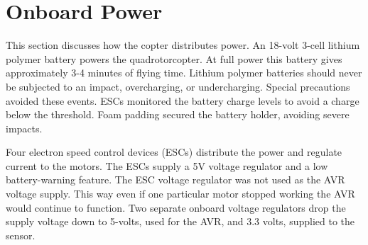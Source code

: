 \section{Onboard Power} 

This section discusses how the copter distributes power.  An 18-volt 3-cell lithium polymer battery powers the quadrotorcopter. At full power this battery gives approximately 3-4 minutes of flying time. Lithium polymer batteries should never be subjected to an impact, overcharging, or undercharging.  Special precautions avoided these events.  ESCs monitored the battery charge levels to avoid a charge below the threshold. Foam padding secured the battery holder, avoiding severe impacts.    %

Four electron speed control devices (ESCs) distribute the power and regulate current to the motors. The ESCs supply a 5V voltage regulator and a low battery-warning feature. The ESC voltage regulator was not used as the AVR voltage supply.   This way even if one particular motor stopped working the AVR would continue to function.  Two separate onboard voltage regulators drop the supply voltage down to 5-volts, used for the AVR, and 3.3 volts, supplied to the sensor. 


